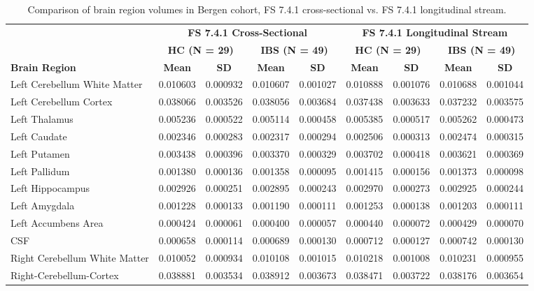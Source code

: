\documentclass[diagnostics,article,accept,pdftex,moreauthors]{Definitions/mdpi}
\begin{document}
\begin{table}[H]
\setlength{\tabcolsep}{4.9pt}
\scriptsize

\caption{Comparison of brain region volumes in Bergen cohort, FS 7.4.1 cross-sectional vs. FS 7.4.1 longitudinal stream.}
\begin{tabular}{lcccccccc}
\toprule
 & \multicolumn{4}{c}{\textbf{FS 7.4.1 Cross-Sectional}} & \multicolumn{4}{c}{\textbf{FS 7.4.1 Longitudinal Stream}} \\
 & \multicolumn{2}{c}{\textbf{HC (N = 29)}} & \multicolumn{2}{c}{\textbf{IBS (N = 49)}} & \multicolumn{2}{c}{\textbf{HC (N = 29)}} & \multicolumn{2}{c}{\textbf{IBS (N = 49)}} \\
\textbf{Brain Region} & \textbf{Mean} & \textbf{SD} & \textbf{Mean} & \textbf{SD} & \textbf{Mean} & \textbf{SD} & \textbf{Mean} & \textbf{SD} \\
\midrule
Left Cerebellum White Matter & 0.010603 & 0.000932 & 0.010607 & 0.001027 & 0.010888 & 0.001076 & 0.010688 & 0.001044 \\
Left Cerebellum Cortex & 0.038066 & 0.003526 & 0.038056 & 0.003684 & 0.037438 & 0.003633 & 0.037232 & 0.003575 \\
Left Thalamus & 0.005236 & 0.000522 & 0.005114 & 0.000458 & 0.005385 & 0.000517 & 0.005262 & 0.000473 \\
Left Caudate & 0.002346 & 0.000283 & 0.002317 & 0.000294 & 0.002506 & 0.000313 & 0.002474 & 0.000315 \\
Left Putamen & 0.003438 & 0.000396 & 0.003370 & 0.000329 & 0.003702 & 0.000418 & 0.003621 & 0.000369 \\
Left Pallidum & 0.001380 & 0.000136 & 0.001358 & 0.000095 & 0.001415 & 0.000156 & 0.001373 & 0.000098 \\
Left Hippocampus & 0.002926 & 0.000251 & 0.002895 & 0.000243 & 0.002970 & 0.000273 & 0.002925 & 0.000244 \\
Left Amygdala & 0.001228 & 0.000133 & 0.001190 & 0.000111 & 0.001253 & 0.000138 & 0.001203 & 0.000111 \\
Left Accumbens Area & 0.000424 & 0.000061 & 0.000400 & 0.000057 & 0.000440 & 0.000072 & 0.000429 & 0.000070 \\
CSF & 0.000658 & 0.000114 & 0.000689 & 0.000130 & 0.000712 & 0.000127 & 0.000742 & 0.000130 \\
Right Cerebellum White Matter & 0.010052 & 0.000934 & 0.010108 & 0.001015 & 0.010218 & 0.001008 & 0.010231 & 0.000955 \\
Right-Cerebellum-Cortex & 0.038881 & 0.003534 & 0.038912 & 0.003673 & 0.038471 & 0.003722 & 0.038176 & 0.003654 \\


\end{tabular}
\end{table}
\end{document}
